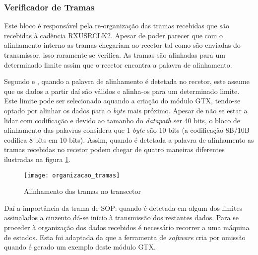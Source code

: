 \subsubsection*{Verificador de Tramas} \label{subsub:serial_frameChecker}
  

Este bloco é responsável pela re-organização das tramas recebidas que são recebidas à cadência RXUSRCLK2. Apesar de poder parecer que com o alinhamento interno as tramas chegariam ao recetor tal como são enviadas do transmissor, isso raramente se verifica. As tramas são alinhadas para um determinado limite assim que o recetor encontra a palavra de alinhamento. %

Segundo \cite{R022} e \cite{R011}, quando a palavra de alinhamento é detetada no recetor, este assume que os dados a partir daí são válidos e alinha-os para um determinado limite. Este limite pode ser selecionado aquando a criação do módulo GTX, tendo-se optado por alinhar os dados para o \textit{byte} mais próximo. Apesar de não se estar a lidar com codificação e devido ao tamanho do \textit{datapath} ser 40 bits, o bloco de alinhamento das palavras considera que 1 \textit{byte} são 10 bits (a codificação 8B/10B codifica 8 bits em 10 bits). Assim, quando é detetada a palavra de alinhamento as tramas recebidas no recetor podem chegar de quatro maneiras diferentes ilustradas na figura \ref{fig:alinhamento_tramas_gtx}.


\begin{figure}[h!]
		\begin{center}
		\leavevmode
		\texttt{[image: organizacao\_tramas]}
		\captionsetup{width=1.0\linewidth}
		\caption[Alinhamento das tramas no transcetor]{Alinhamento das tramas no transcetor}
		\label{fig:alinhamento_tramas_gtx}
	\end{center}
\end{figure}

Daí a importância da trama de SOP: quando é detetada em algum dos limites assinalados a cinzento dá-se início à transmissão dos restantes dados. Para se proceder à organização dos dados recebidos é necessário recorrer a uma máquina de estados. Esta foi adaptada da que a ferramenta de \textit{software} cria por omissão quando é gerado um exemplo deste módulo GTX.

